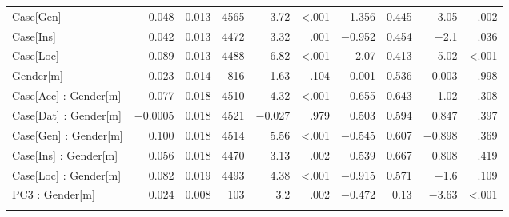 \documentclass[output=paper, modfonts,newtxmath,hidelinks]{langscibook}
\begin{document}
\begin{sidewaystable}
\begin{tabular}{l*{9}r}
	Case[Gen]	&	0.048	&	0.013	& 4565 &	3.72	& <.001	&
					$-$1.356	&	0.445	&$-$3.05	&.002\\
	Case[Ins]	&	0.042	&	0.013	& 4472 &	3.32	& .001		&
					$-$0.952	&	0.454	&$-$2.1	&.036\\
	Case[Loc]	&	0.089	&	0.013	& 4488 &	6.82	& <.001	&
					$-$2.07	&	0.413	&$-$5.02	&<.001\\
	Gender[m]	&	$-$0.023	&	0.014	& 816  &	$-$1.63	& .104		&
					0.001	&	0.536	&0.003	&.998\\
	Case[Acc] : Gender[m]	& $-$0.077	& 0.018 &	4510 &	$-$4.32 & <.001	&
	      					  0.655		&	0.643	&1.02	&.308\\
	Case[Dat] : Gender[m]	& $-$0.0005	& 0.018 &	4521 &	$-$0.027 & .979	&
								0.503	&	0.594	&0.847	&.397\\
	Case[Gen] : Gender[m]	& 0.100		& 0.018 &	4514 &	5.56  &	<.001	&
							 $-$0.545	&	0.607	&$-$0.898	&.369\\
	Case[Ins] : Gender[m] &	0.056	& 0.018 &	4470 &	3.13  &	.002	&
								0.539	&	0.667	&0.808	&.419\\	
	Case[Loc] : Gender[m]	& 0.082		& 0.019 &	4493 &	4.38  &	<.001	&
							$-$0.915	&	0.571	&$-$1.6	&.109\\
	PC3 : Gender[m]			& 0.024		& 0.008 &	103  &	3.2	  & .002	&
								$-$0.472	&	0.13	&$-$3.63	&<.001\\
   \lspbottomrule
	\end{tabular}    
\end{sidewaystable}
\end{document}
